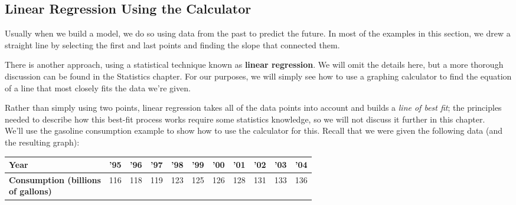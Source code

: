 \subsection{Linear Regression Using the Calculator}
Usually when we build a model, we do so using data from the past to predict the future.  In most of the examples in this section, we drew a straight line by selecting the first and last points and finding the slope that connected them.

There is another approach, using a statistical technique known as \textbf{linear regression}.  We will omit the details here, but a more thorough discussion can be found in the Statistics chapter.  For our purposes, we will simply see how to use a graphing calculator to find the equation of a line that most closely fits the data we're given.

Rather than simply using two points, linear regression takes all of the data points into account and builds a \textit{line of best fit}; the principles needed to describe how this best-fit process works require some statistics knowledge, so we will not discuss it further in this chapter.\\

We'll use the gasoline consumption example to show how to use the calculator for this.  Recall that we were given the following data (and the resulting graph):
\begin{center}
\begin{tabular}{|p{1in} | c | c | c | c | c | c | c | c | c | c|}
\hline
\textbf{Year} & '95 & '96 & '97 & '98 & '99 & '00 & '01 & '02 & '03 & '04\\
\hline
\parbox{0.9in}{\textbf{Consumption (billions}\\ \textbf{of gallons)}} & 116 & 118 & 119 & 123 & 125 & 126 & 128 & 131 & 133 & 136\\
\hline
\end{tabular}
\end{center}

\begin{center}
\end{center}

